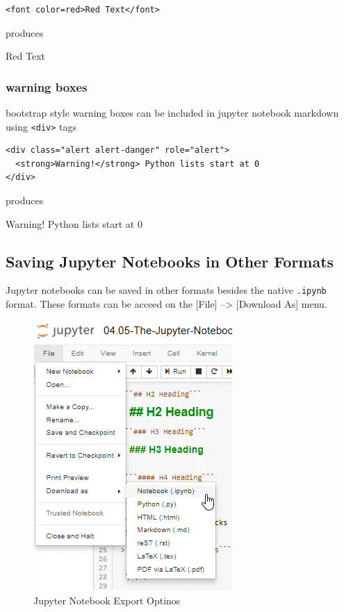 \documentclass{book}
\makeatletter
\def\maxwidth{\ifdim\Gin@nat@width>\linewidth\linewidth
    \else\Gin@nat@width\fi}
\let\Oldincludegraphics\includegraphics
\renewcommand{\includegraphics}[1]{\Oldincludegraphics[width=.8\maxwidth]{#1}}
\makeatother
\begin{document}
\begin{lstlisting}
<font color=red>Red Text</font>
\end{lstlisting}

produces

Red Text

\subsubsection{warning boxes}\label{warning-boxes}

bootstrap style warning boxes can be included in jupyter notebook
markdown using \lstinline!<div>! tags

\begin{lstlisting}
<div class="alert alert-danger" role="alert">
  <strong>Warning!</strong> Python lists start at 0
</div>
\end{lstlisting}

produces

Warning! Python lists start at 0

    \subsection{Saving Jupyter Notebooks in Other
Formats}\label{saving-jupyter-notebooks-in-other-formats}

Jupyter notebooks can be saved in other formats besides the native
\lstinline!.ipynb! format. These formats can be acceed on the {[}File{]}
--\textgreater{} {[}Download As{]} menu.

\begin{figure}
\centering
\includegraphics{images/jupyter_notebook_export_options.png}
\caption{Jupyter Notebook Export Optinos}
\end{figure}
\end{document}
